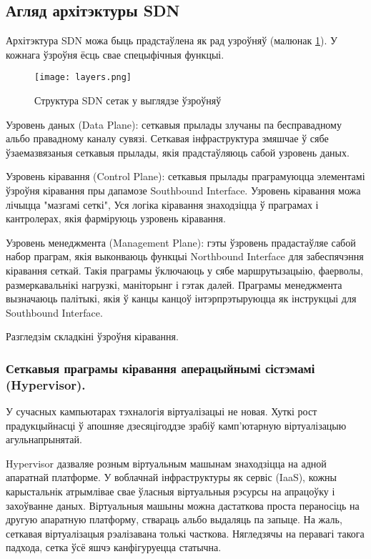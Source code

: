 \subsection{Агляд архітэктуры SDN}

Архітэктура SDN можа быць прадстаўлена як рад узроўняў (малюнак \ref{img: Layers}).
У кожнага ўзроўня ёсць свае спецыфічныя функцыі.
\begin{figure}[ht!]
    \centering
    \texttt{[image: layers.png]}
    \caption{Структура SDN сетак у выглядзе ўзроўняў}
    \label{img: Layers}
\end{figure}

Узровень даных (Data Plane): сеткавыя прылады злучаны па бесправадному альбо
правадному каналу сувязі. Сеткавая інфраструктура змяшчае ў сябе ўзаемазвязаныя
сеткавыя прылады, якія прадстаўляюць сабой узровень даных.

Узровень кіравання (Control Plane): сеткавыя прылады праграмуюцца элементамі
ўзроўня кіравання пры дапамозе Southbound Interface. Узровень кіравання
можа лічыцца "мазгамі сеткі", Уся логіка кіравання знаходзіцца ў праграмах і кантролерах,
якія фарміруюць узровень кіравання.

Узровень менеджмента (Management Plane): гэты ўзровень прадастаўляе сабой
набор праграм, якія выконваюць функцыі Northbound Interface для забеспячэння
кіравання сеткай. Такія праграмы ўключаюць у сябе маршрутызацыію, фаерволы,
размеркавальнікі нагрузкі, маніторынг і гэтак далей.
Праграмы менеджмента вызначаюць палітыкі, якія ў канцы канцоў інтэрпрэтыруюцца
як інструкцыі для Southbound Interface.

Разгледзім складкіні ўзроўня кіравання.

\subsubsection{Сеткавыя праграмы кіравання аперацыйнымі сістэмамі (Hypervisor).}
У сучасных кампьютарах тэхналогія віртуалізацыі не новая.
Хуткі рост прадукцыйнасці ў апошняе дзесяцігоддзе зрабіў камп'ютарную віртуалізацыю
агульнапрынятай.

Hypervisor дазваляе розным віртуальным машынам знаходзіцца на адной апаратнай платформе. У воблачнай інфраструктуры як сервіс (IaaS), кожны карыстальнік
атрымлівае свае ўласныя віртуальныя рэсурсы на апрацоўку і захоўванне даных.
Віртуальныя машыны можна дастаткова проста пераносіць на другую апаратную платформу,
ствараць альбо выдаляць па запыце. На жаль, сеткавая віртуалізацыя рэалізавана
толькі часткова. Нягледзячы на перавагі такога падхода, сетка ўсё яшчэ канфігуруецца статычна.

